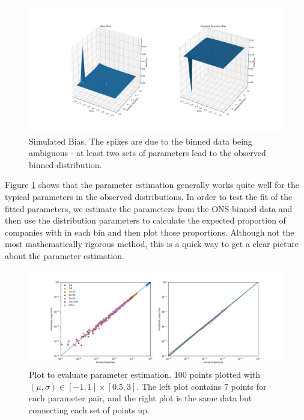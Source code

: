 \documentclass[a4paper,10pt]{article}
\begin{document}
   \begin{figure}[!ht]
      \begin{center}
         \caption{Simulated Bias. The spikes are due to the binned data being ambiguous - at least two sets of parameters lead to the observed binned distribution.}
         \label{bias}
         \includegraphics[width=\textwidth]{graphs/bias}
      \end{center}
   \end{figure}
   Figure \ref{bias} shows that the parameter estimation generally works quite well for the typical parameters in the observed distributions. In order to test the fit of the fitted parameters, we estimate the parameters from the ONS binned data and then use the distribution parameters to calculate the expected proportion of companies with in each bin and then plot those proportions. Although not the most mathematically rigorous method, this is a quick way to get a clear picture about the parameter estimation.
   \begin{figure}[!ht]
      \begin{center}
         \caption{Plot to evaluate parameter estimation. 100 points plotted with $(\mu, \sigma) \in [-1, 1] \times [0.5, 3]$. The left plot contains 7 points for each parameter pair, and the right plot is the same data but connecting each set of points up.}
         \label{parameter_reconstruction}
         \includegraphics[width=\textwidth]{graphs/loglog_reconstruction}
      \end{center}
   \end{figure}
\end{document}
